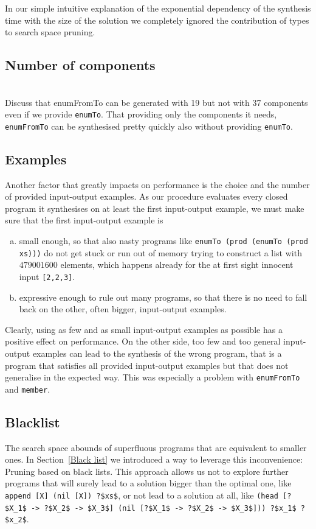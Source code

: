 In our simple intuitive explanation of the exponential dependency of the synthesis time with the size of the solution we completely ignored the contribution of types to search space pruning.

\subsection{Number of components}
\\
Discuss that enumFromTo can be generated with 19 but not with 37 components even if we provide \lstinline?enumTo?. That providing only the components it needs, \lstinline?enumFromTo? can be synthesised pretty quickly also without providing \lstinline?enumTo?.


\subsection{Examples}
Another factor that greatly impacts on performance is the choice and the number of provided input-output examples. As our procedure evaluates every closed program it synthesises on at least the first input-output example, we must make sure that the first input-output example is
\begin{enumerate}[a.]
\item small enough, so that also nasty programs like \lstinline?enumTo (prod (enumTo (prod xs)))? do not get stuck or run out of memory trying to construct a list with $479001600$ elements, which happens already for the at first sight innocent input \lstinline?[2,2,3]?.
\item expressive enough to rule out many programs, so that there is no need to fall back on the other, often bigger, input-output examples.
\end{enumerate}
Clearly, using as few and as small input-output examples as possible has a positive effect on performance. On the other side, too few and too general input-output examples can lead to the synthesis of the wrong program, that is a program that satisfies all provided input-output examples but that does not generalise in the expected way. This was especially a problem with \lstinline?enumFromTo? and \lstinline?member?.

\subsection{Blacklist}
The search space abounds of superfluous programs that are equivalent to smaller ones. In Section~\ref{Black list} we introduced a way to leverage this inconvenience: Pruning based on black lists. This approach allows us not to explore further programs that will surely lead to a solution bigger than the optimal one, like \lstinline!append [X] (nil [X]) ?$xs$!, or not lead to a solution at all, like \lstinline!(head [?$X_1$ -> ?$X_2$ -> $X_3$] (nil [?$X_1$ -> ?$X_2$ -> $X_3$])) ?$x_1$ ?$x_2$!.


